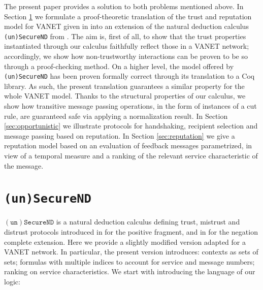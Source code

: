 \documentclass[compsoc, conference, letterpaper, 10pt, times]{IEEEtran}
\begin{document}
The present paper provides a solution to both problems mentioned above. In Section \ref{sec:logic} we formulate a proof-theoretic translation of the trust and reputation model for VANET given in \cite{glenford} into an extension of the natural deduction calculus \texttt{(un)SecureND} from \cite{DBLP:conf/ifiptm/Primiero16}. The aim is, first of all, to show that the trust properties instantiated through our calculus faithfully reflect those in a VANET network; accordingly, we show how non-trustworthy interactions can be proven to be so through a proof-checking method. On a higher level, the model offered by \texttt{(un)SecureND} has been proven formally correct through its translation to a Coq library. As such, the present translation guarantees a similar property for the whole VANET model. Thanks to the structural properties of our calculus, we show how transitive message passing operations, in the form of instances of a cut rule, are guaranteed safe via applying a normalization result. In Section \ref{sec:opportunistic} we illustrate protocols for handshaking, recipient selection and message passing based on reputation. In Section \ref{sec:reputation} we give a reputation model based on an evaluation of feedback messages parametrized, in view of a temporal measure and a ranking of the relevant service characteristic of the message.




\section{\texttt{(un)SecureND}}\label{sec:logic}

$\mathtt{(un)SecureND}$ is a natural deduction calculus defining trust, mistrust and distrust protocols introduced in \cite{primiero_secureND} for the positive fragment,  and in \cite{DBLP:conf/ifiptm/Primiero16} for the negation complete extension. Here we provide  a slightly modified version adapted for a VANET network. In particular, the present version introduces: contexts as sets of sets; formulas with multiple indices to account for service and message numbers; ranking on service characteristics. We start with introducing the language of our logic:
\end{document}
